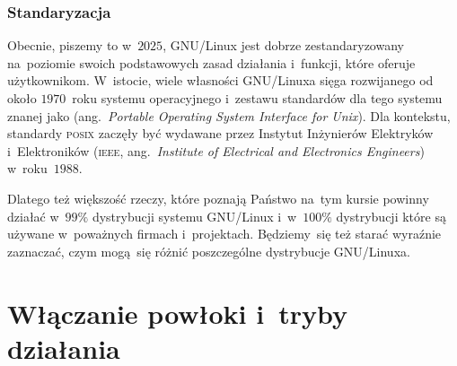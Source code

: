 \documentclass[10pt,t]{beamer}
\begin{document}
\begin{frame}
  \frametitle{Standaryzacja}


  Obecnie, piszemy to w~$2025$, GNU/Linux jest dobrze zestandaryzowany
  na~poziomie swoich podstawowych zasad działania i~funkcji, które oferuje
  użytkownikom. W~istocie, wiele własności GNU/Linuxa sięga rozwijanego od
  około $1970$~roku systemu operacyjnego
   i~zestawu
  standardów dla tego systemu znanej jako
  (ang.~\textit{Portable Operating System Interface for Unix}). Dla
  kontekstu, standardy \textsc{posix} zaczęły być wydawane przez Instytut
  Inżynierów Elektryków i~Elektroników (\textsc{ieee},
  ang.~\textit{Institute of Electrical and Electronics Engineers})
  w~roku~$1988$.

  Dlatego też większość rzeczy, które poznają Państwo na~tym kursie powinny
  działać w~$99\%$ dystrybucji systemu GNU/Linux i~w~$100\%$ dystrybucji
  które są używane w~poważnych firmach i~projektach. Będziemy~się też
  starać wyraźnie zaznaczać, czym mogą~się różnić poszczególne dystrybucje
  GNU/Linuxa.

\end{frame}










\section{Włączanie powłoki i~tryby działania}
\end{document}
